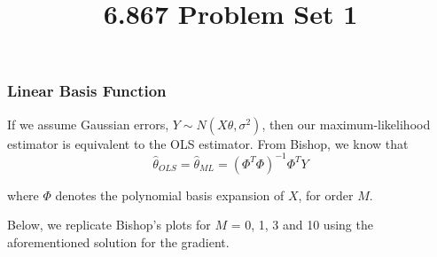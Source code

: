 \documentclass[10pt]{article}
\begin{document}
	\title{6.867 Problem Set 1}
	\maketitle

\subsubsection*{Linear Basis Function}

If we assume Gaussian errors,  $Y \sim N(X\theta, \sigma^2)$, then our maximum-likelihood estimator is equivalent to the OLS estimator. From Bishop, we know that
\begin{equation*}
	\hat{\theta}_{OLS}=\hat{\theta}_{ML}=(\Phi^T \Phi)^{-1}\Phi^T Y
\end{equation*}

where $\Phi$ denotes the polynomial basis expansion of $X$, for order $M$.

Below, we replicate Bishop's plots for $M$ = 0, 1, 3 and 10 using the aforementioned solution for the gradient.
\end{document}
